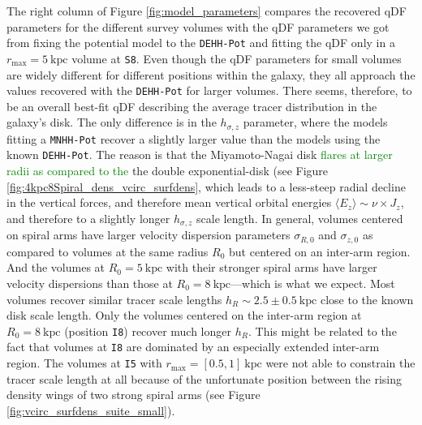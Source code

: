 \documentclass[iop,revtex4,numberedappendix,appendixfloats]{emulateapj}
\newcommand{\NEW}[1]{\textcolor{Green}{#1}}
\newcommand{\OLD}[1]{}
\begin{document}
The right column of Figure \ref{fig:model_parameters} compares the recovered qDF parameters for the different survey volumes with the qDF parameters we got from fixing the potential model to the \texttt{DEHH-Pot} and fitting the qDF only in a $r_\text{max}=5~\text{kpc}$ volume at \texttt{S8}. Even though the qDF parameters for small volumes are widely different for different positions within the galaxy, they all approach the values recovered with the \texttt{DEHH-Pot} for larger volumes. There seems, therefore, to be an overall best-fit qDF describing the average tracer distribution in the galaxy's disk. The only difference is in the $h_{\sigma,z}$ parameter, where the models fitting a \texttt{MNHH-Pot} recover a slightly larger value than the models using the known \texttt{DEHH-Pot}. The reason is that the Miyamoto-Nagai disk \OLD{has a different radial profile than}\NEW{flares at larger radii as compared to the} the double exponential-disk (see Figure \OLD{\ref{fig:4kpc8Spiral_density}}\NEW{\ref{fig:4kpc8Spiral_dens_vcirc_surfdens}}, which leads to a less-steep radial decline in the vertical forces, and therefore mean vertical orbital energies $\langle E_z \rangle \sim \nu \times J_z$, and therefore to a slightly longer $h_{\sigma,z}$ scale length. In general, volumes centered on spiral arms have larger velocity dispersion parameters $\sigma_{R,0}$ and $\sigma_{z,0}$ as compared to volumes at the same radius $R_0$ but centered on an inter-arm region. And the volumes at $R_0=5~\text{kpc}$ with their stronger spiral arms have larger velocity dispersions than those at $R_0=8~\text{kpc}$---which is what we expect. Most volumes recover similar tracer scale lengths $h_R\sim2.5\pm0.5~\text{kpc}$ close to the known disk scale length. Only the volumes centered on the inter-arm region at $R_0=8~\text{kpc}$ (position \texttt{I8}) recover much longer $h_R$. This might be related to the fact that volumes at \texttt{I8} are dominated by an especially extended inter-arm region. The volumes at \texttt{I5} with $r_\text{max}=[0.5,1]~\text{kpc}$ were not able to constrain the tracer scale length at all because of the unfortunate position between the rising density wings of two strong spiral arms (see Figure \ref{fig:vcirc_surfdens_suite_small}).
\end{document}
